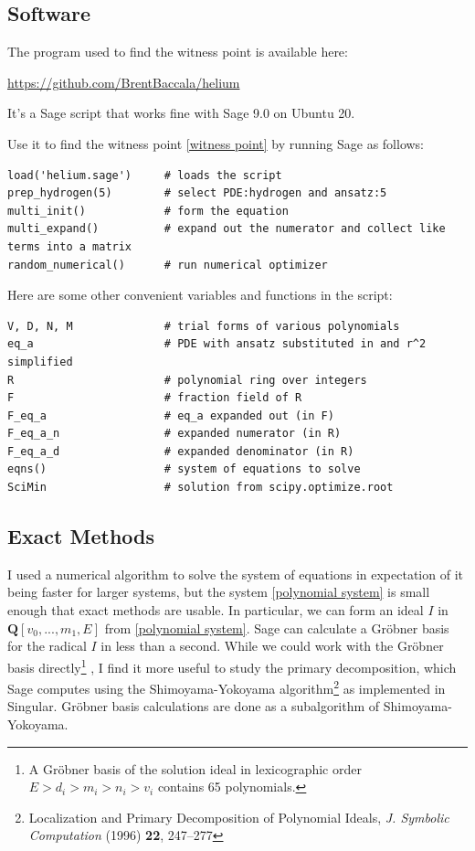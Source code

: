 \documentclass{article}
\begin{document}
\subsection*{Software}

The program used to find the witness point is available here:

\centerline{\url{https://github.com/BrentBaccala/helium}}

It's a Sage script that works fine with Sage 9.0 on Ubuntu 20.

Use it to find the witness point \eqref{witness point} by
running Sage as follows:

\begin{verbatim}
load('helium.sage')     # loads the script
prep_hydrogen(5)        # select PDE:hydrogen and ansatz:5
multi_init()            # form the equation
multi_expand()          # expand out the numerator and collect like terms into a matrix
random_numerical()      # run numerical optimizer
\end{verbatim}

Here are some other convenient variables and functions in the script:

\begin{verbatim}
V, D, N, M              # trial forms of various polynomials
eq_a                    # PDE with ansatz substituted in and r^2 simplified
R                       # polynomial ring over integers
F                       # fraction field of R
F_eq_a                  # eq_a expanded out (in F)
F_eq_a_n                # expanded numerator (in R)
F_eq_a_d                # expanded denominator (in R)
eqns()                  # system of equations to solve
SciMin                  # solution from scipy.optimize.root
\end{verbatim}

\subsection*{Exact Methods}

I used a numerical algorithm to solve the system of equations in expectation
of it being faster for larger systems, but the system \eqref{polynomial system}
is small enough that exact methods are usable.  In particular, we can form
an ideal $I$ in $\mathbf{Q}[v_0,...,m_1,E]$ from \eqref{polynomial system}.
Sage can calculate a Gr\"obner basis for the radical $I$ in less than a second.
While we could work with the Gr\"obner basis directly\footnote{A Gr\"obner basis
of the solution ideal in lexicographic order $E>d_i>m_i>n_i>v_i$ contains 65 polynomials.}
, I find it more
useful to study the primary decomposition, which Sage computes using
the Shimoyama-Yokoyama algorithm\footnote{Localization and Primary Decomposition of
Polynomial Ideals, {\it J. Symbolic Computation} (1996) {\bf 22}, 247–277}
as implemented in Singular.  Gr\"obner basis calculations are done
as a subalgorithm of Shimoyama-Yokoyama.
\end{document}
